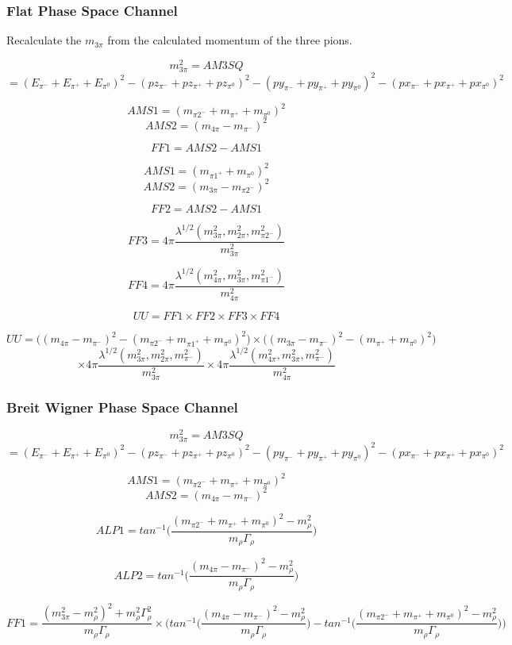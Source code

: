 \documentclass[12pt]{article}
\begin{document}
\subsubsection{Flat Phase Space Channel}
Recalculate the $m_{3\pi}$ from the calculated momentum of the three pions.

\[m_{3\pi}^2 = AM3SQ \]
\[= (E_{\pi^-}+E_{\pi^+}+E_{\pi^0})^2 - (pz_{\pi^-}+pz_{\pi^+}+pz_{\pi^0})^2- (py_{\pi^-}+py_{\pi^+}+py_{\pi^0})^2- (px_{\pi^-}+px_{\pi^+}+px_{\pi^0})^2\]

\[AMS1 = (m_{\pi2^-} + m_{\pi^+} + m_{\pi^0})^2\]
\[AMS2 = (m_{4\pi}-m_{\pi^-})^2\]

\[FF1 = AMS2 - AMS1\]

\[AMS1 = (m_{\pi1^+} + m_{\pi^0})^2\]
\[AMS2 = (m_{3\pi}-m_{\pi2^-})^2\]


\[FF2=AMS2-AMS1\]

\[FF3 =  4\pi \frac{\lambda^{1/2}(m_{3\pi}^2, m_{2\pi}^2, m_{\pi2^-}^2)}{m_{3\pi}^2}\]

\[FF4 =  4\pi \frac{\lambda^{1/2}(m_{4\pi}^2, m_{3\pi}^2, m_{\pi1^-}^2)}{m_{4\pi}^2}\]

\[UU = FF1 \times FF2 \times FF3 \times FF4\]

\[UU = \Big((m_{4\pi}-m_{\pi^-})^2 - (m_{\pi2^-} + m_{\pi1^+} + m_{\pi^0})^2\Big) \times
	\Big( (m_{3\pi}-m_{\pi^-})^2 - (m_{\pi^+} + m_{\pi^0})^2\Big)  \]
	\[\times 4\pi \frac{\lambda^{1/2}(m_{3\pi}^2, m_{2\pi}^2, m_{\pi^-}^2)}{m_{3\pi}^2} \times
	4\pi \frac{\lambda^{1/2}(m_{4\pi}^2, m_{3\pi}^2, m_{\pi^-}^2)}{m_{4\pi}^2} \]


\subsubsection{Breit Wigner Phase Space Channel}

\[m_{3\pi}^2 = AM3SQ \]
\[= (E_{\pi^-}+E_{\pi^+}+E_{\pi^0})^2 - (pz_{\pi^-}+pz_{\pi^+}+pz_{\pi^0})^2- (py_{\pi^-}+py_{\pi^+}+py_{\pi^0})^2- (px_{\pi^-}+px_{\pi^+}+px_{\pi^0})^2\]

\[AMS1 = (m_{\pi2^-} + m_{\pi^+} + m_{\pi^0})^2\]
\[AMS2 = (m_{4\pi}-m_{\pi^-})^2\]

\[ALP1 = tan^{-1}\Big(\frac{(m_{\pi2^-} + m_{\pi^+} + m_{\pi^0})^2 - m_\rho^2}{m_\rho \Gamma_\rho}\Big)\]

\[ALP2 = tan^{-1}\Big(\frac{(m_{4\pi}-m_{\pi^-})^2 - m_\rho^2}{m_\rho \Gamma_\rho}\Big)\]


\[FF1 = \frac{(m_{3\pi}^2 - m_\rho^2)^2 + 	m_\rho^2 \Gamma_\rho^2}{m_\rho \Gamma_\rho} \times \Bigg(tan^{-1}\Big(\frac{(m_{4\pi}-m_{\pi^-})^2 - m_\rho^2}{m_\rho \Gamma_\rho}\Big) -  tan^{-1}\Big(\frac{(m_{\pi2^-} + m_{\pi^+} + m_{\pi^0})^2 - m_\rho^2}{m_\rho \Gamma_\rho}\Big)  \Bigg)\]
\end{document}
